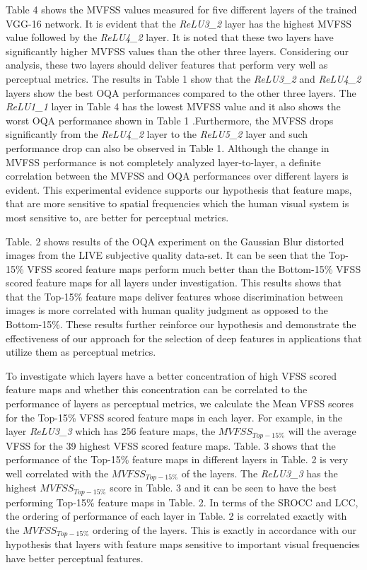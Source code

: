 \documentclass[10pt,twocolumn,letterpaper]{article}
\begin{document}
Table 4 shows the MVFSS values measured for five different layers of the trained VGG-16 network. It is evident that the \textit{ReLU3\_2} layer has the highest MVFSS value followed by the \textit{ReLU4\_2} layer. It is noted that these two layers have significantly higher MVFSS values than the other three layers. Considering our analysis, these two layers should deliver features that perform very well as perceptual metrics. The results in Table 1 show that the \textit{ReLU3\_2} and \textit{ReLU4\_2} layers show the best OQA performances compared to the other three layers. The \textit{ReLU1\_1} layer in Table 4 has the lowest MVFSS value and it also shows the worst OQA performance shown in Table 1 .Furthermore, the MVFSS drops significantly from the \textit{ReLU4\_2} layer to the \textit{ReLU5\_2} layer and such performance drop can also be observed in Table 1. Although the change in MVFSS performance is not completely analyzed layer-to-layer, a definite correlation between the MVFSS and OQA performances over different layers is evident. This experimental evidence supports our hypothesis that feature maps, that are more sensitive to spatial frequencies which the human visual system is most sensitive to, are better for perceptual metrics. 

Table. 2 shows results of the OQA experiment on the Gaussian Blur distorted images from the LIVE subjective quality data-set. It can be seen that the Top-15\% VFSS scored feature maps perform much better than the Bottom-15\% VFSS scored feature maps for all layers under investigation. This results shows that that the Top-15\% feature maps deliver features whose discrimination between images is more correlated with human quality judgment as opposed to the Bottom-15\%. These results further reinforce our hypothesis and demonstrate the effectiveness of our approach for the selection of deep features in applications that utilize them as perceptual metrics.

To investigate which layers have a better concentration of high VFSS scored feature maps and whether this concentration can be correlated to the performance of layers as perceptual metrics, we calculate the Mean VFSS scores for the Top-15\% VFSS scored feature maps in each layer. For example, in the layer \textit{ReLU3\_3} which has 256 feature maps, the $MVFSS_{Top-15\%}$ will the average VFSS for the 39 highest VFSS scored feature maps. Table. 3 shows that the performance of the Top-15\% feature maps in different layers in Table. 2 is very well correlated with the $MVFSS_{Top-15\%}$ of the layers. The \textit{ReLU3\_3} has the highest $MVFSS_{Top-15\%}$ score in Table. 3 and it can be seen to have the best performing Top-15\% feature maps in Table. 2. In terms of the SROCC and LCC, the ordering of performance of each layer in Table. 2 is correlated exactly with the $MVFSS_{Top-15\%}$ ordering of the layers. This is exactly in accordance with our hypothesis that layers with feature maps sensitive to important visual frequencies have better perceptual features.
\end{document}
